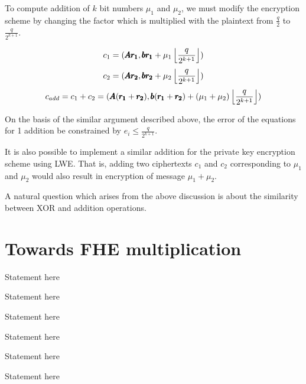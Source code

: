 \documentclass[usletter]{article}
\begin{document}
\begin{corollary}
To compute addition of $k$ bit numbers $\mu_1$ and $\mu_2$, we must modify the encryption scheme by changing the factor which is multiplied with the plaintext from $\frac{q}{2}$ to $\frac{q}{2^{k+1}}$.

$$c_1 = ( \pmb{Ar_1}, \pmb{br_1} + \mu_1\left\lfloor \frac{q}{2^{k+1}} \right\rfloor )$$
$$c_2 = ( \pmb{Ar_2}, \pmb{br_2} + \mu_2\left\lfloor \frac{q}{2^{k+1}} \right\rfloor )$$
$$c_{add} = c_1 + c_2 = ( \pmb{A}(\pmb{r_1} + \pmb{r_2}), \pmb{b}(\pmb{r_1} +\pmb{r_2}) + (\mu_1 + \mu_2)\left\lfloor \frac{q}{2^{k+1}} \right\rfloor )$$

On the basis of the similar argument described above, the error of the equations for 1 addition be 
constrained by $e_i \leq \frac{q}{2^{k+1}}$.
\end{corollary}
\begin{remark}
It is also possible to implement a similar addition for the private key encryption  scheme 
using LWE. That is, adding two ciphertexts $c_1$ and $c_2$ corresponding to $\mu_1$ and $\mu_2$
would also result in encryption of message $\mu_1 + \mu_2$.
\end{remark}

\begin{remark}
A natural question which arises from the above discussion is about the similarity between XOR and addition operations.   
\end{remark}

\section{Towards FHE multiplication}

\begin{theorem}
Statement here 
\end{theorem}

\begin{lemma}
Statement here
\end{lemma}

\begin{corollary}
Statement here
\end{corollary}

\begin{proposition}
Statement here
\end{proposition}

\begin{fact}
Statement here
\end{fact}

\begin{claim}
Statement here
\end{claim}
\end{document}
